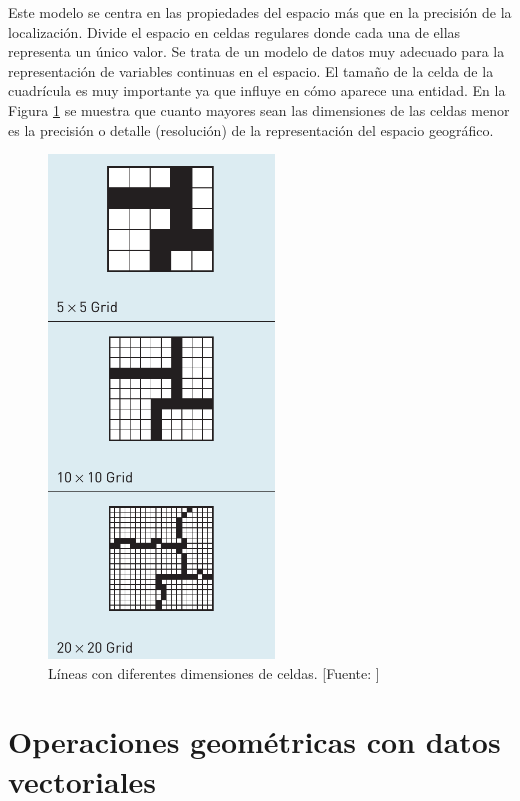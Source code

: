 Este modelo se centra en las propiedades del espacio más que en la precisión de la localización. Divide el espacio en celdas regulares donde cada una de ellas representa un único valor. Se trata de un modelo de datos muy adecuado para la representación de variables continuas en el espacio. El tamaño de la celda de la cuadrícula es muy importante ya que influye en cómo aparece una entidad. En la Figura \ref{fig:rasterResolution} se muestra que cuanto mayores sean las dimensiones de las celdas menor es la precisión o detalle (resolución) de la representación del espacio geográfico.

\begin{figure}[H]
    \centering
    \includegraphics[width=6cm]{RasterResolution.png}
    \caption{Líneas con diferentes dimensiones de celdas. [Fuente: \citet{Heywood2006AnSystems}]}
    \label{fig:rasterResolution}
\end{figure}


\section{Operaciones geométricas con datos vectoriales}

